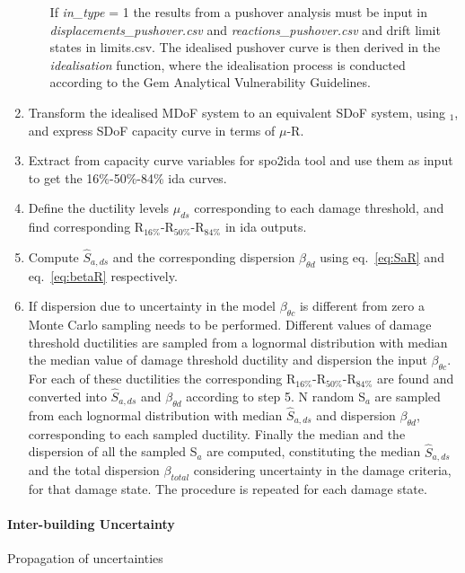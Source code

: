 \begin{enumerate}
\begin{enumerate}
If \textit{in\_type} = 1 the results from a pushover analysis must be input in \textit{displacements\_pushover.csv} and \textit{reactions\_pushover.csv} and drift limit states in {limits.csv}. The idealised pushover curve is then derived in the \textit{idealisation} function, where the idealisation process is conducted according to the Gem Analytical Vulnerability Guidelines.	\end{enumerate}
\item Transform the idealised MDoF system to an equivalent SDoF system, using \Gamma$_1$, and express SDoF capacity curve in terms of $\mu$-R.
\item Extract from capacity curve variables for spo2ida tool and use them as input to get the 16\%-50\%-84\% ida curves.
\item Define the ductility levels $\mu_{ds}$ corresponding to each damage threshold, and find corresponding R$_{16\%}$-R$_{50\%}$-R$_{84\%}$ in ida outputs.
\item Compute $\hat{S}_{a,ds}$ and the corresponding dispersion $\beta_{\theta d}$ using eq.~\ref{eq:SaR} and eq.~\ref{eq:betaR} respectively.
\item If dispersion due to uncertainty in the model $\beta_{\theta c}$ is different from zero a Monte Carlo sampling needs to be performed. Different values of damage threshold ductilities are sampled from a  lognormal distribution with median the median value of damage threshold ductility and dispersion the input $\beta_{\theta c}$. For each of these ductilities the corresponding R$_{16\%}$-R$_{50\%}$-R$_{84\%}$ are found and converted into $\hat{S}_{a,ds}$ and $\beta_{\theta d}$ according to step 5. N random S$_a$ are sampled from each lognormal distribution with median $\hat{S}_{a,ds}$ and dispersion $\beta_{\theta d}$, corresponding to each sampled ductility. Finally the median and the dispersion of all the sampled S$_a$ are computed, constituting the median $\hat{S}_{a,ds}$ and the total dispersion $\beta_{total}$ considering uncertainty in the damage criteria, for that damage state. The procedure is repeated for each damage state.

\end{enumerate}

\paragraph{Inter-building Uncertainty}
Propagation of uncertainties

